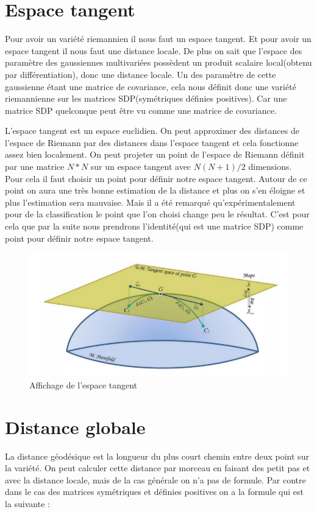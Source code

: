 \documentclass{article}[12pt]
\begin{document}
\section{Espace tangent}
Pour avoir un variété riemannien il nous faut un espace tangent. Et pour avoir un espace tangent il nous faut une distance locale. De plus on sait que l'espace des paramètre des gaussiennes multivariées possèdent un produit scalaire local(obtenu par différentiation), donc une distance locale. Un des paramètre de cette gaussienne étant une matrice de covariance, cela nous définit donc une variété riemannienne sur les matrices SDP(symétriques définies positives). Car une matrice SDP quelconque  peut être vu comme une matrice de covariance.

L'espace tangent est un espace euclidien. On peut approximer des distances de l'espace de Riemann par des distances dans l'espace tangent et cela fonctionne assez bien localement. On peut projeter un point de l'espace de Riemann définit par une matrice $N*N$ sur un espace tangent avec $N(N+1)/2$ dimensions. Pour cela il faut choisir un point pour définir notre espace tangent. Autour de ce point on aura une très bonne estimation de la distance et plus on s'en éloigne et plus l'estimation sera mauvaise. Mais il a été remarqué qu’expérimentalement pour de la classification le point que l'on choisi change peu le résultat. C'est pour cela que par la suite nous prendrons l'identité(qui est une matrice SDP) comme point pour définir notre espace tangent.

\begin{figure}[H]
\begin{center}
\includegraphics[scale=0.5]{images/Riemann_tangent_space.png}
\end{center}
\caption{Affichage de l'espace tangent}
\end{figure}


\section{Distance globale}
La distance géodésique est la longueur du plus court chemin entre deux point sur la variété. On peut calculer cette distance par morceau en faisant des petit pas et avec la distance locale, mais de la cas générale on n'a pas de formule. Par contre dans le cas des matrices symétriques et définies positives on a la formule qui est la suivante :
\end{document}

